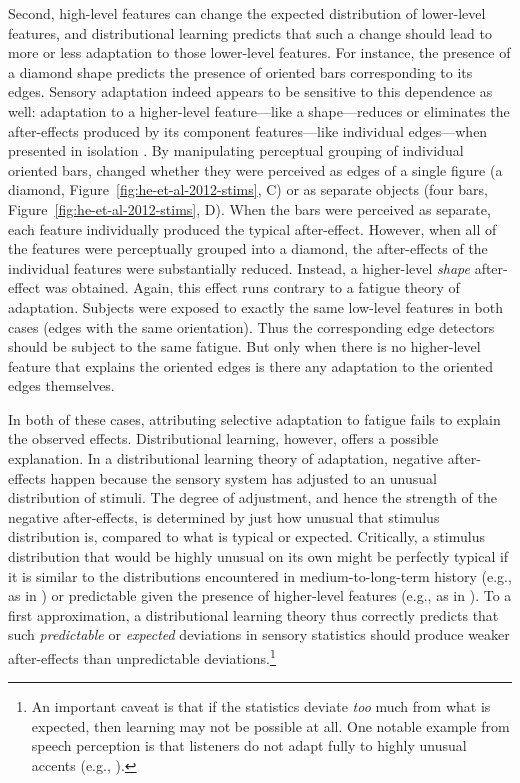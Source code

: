 Second, high-level features can change the expected distribution of lower-level features, and distributional learning predicts that such a change should lead to more or less adaptation to those lower-level features.  For instance, the presence of a diamond shape predicts the presence of oriented bars corresponding to its edges.  Sensory adaptation indeed appears to be sensitive to this dependence as well: adaptation to a higher-level feature---like a shape---reduces or eliminates the after-effects produced by its component features---like individual edges---when presented in isolation \cite{He2012}.
By manipulating perceptual grouping of individual oriented bars,  changed whether they were perceived as edges of a single figure (a diamond, Figure~\ref{fig:he-et-al-2012-stims}, C) or as separate objects (four bars, Figure~\ref{fig:he-et-al-2012-stims}, D).  When the bars were perceived as separate, each feature individually produced the typical after-effect.  However, when all of the features were perceptually grouped into a diamond, the after-effects of the individual features were substantially reduced.  Instead, a higher-level \emph{shape} after-effect was obtained.  Again, this effect runs contrary to a fatigue theory of adaptation.  Subjects were exposed to exactly the same low-level features in both cases (edges with the same orientation). Thus the corresponding edge detectors should be subject to the same fatigue.  But only when there is no higher-level feature that explains the oriented edges is there any adaptation to the oriented edges themselves.

In both of these cases, attributing selective adaptation to fatigue fails to explain the observed effects. Distributional learning, however, offers a possible explanation. In a distributional learning theory of adaptation, negative after-effects happen because the sensory system has adjusted to an unusual distribution of stimuli.  The degree of adjustment, and hence the strength of the negative after-effects, is determined by just how unusual that stimulus distribution is, compared to what is typical or expected.  Critically, a stimulus distribution that would be highly unusual on its own might be perfectly typical if it is similar to the distributions encountered in medium-to-long-term history (e.g., as in ) or predictable given the presence of higher-level features (e.g., as in ).  To a first approximation, a distributional learning theory thus correctly predicts that such \emph{predictable} or \emph{expected} deviations in sensory statistics should produce weaker after-effects than unpredictable deviations.\footnote{An important caveat is that if the statistics deviate \emph{too} much from what is expected, then learning may not be possible at all.  One notable example from speech perception is that listeners do not adapt fully to highly unusual accents (e.g., \protect{}).}

